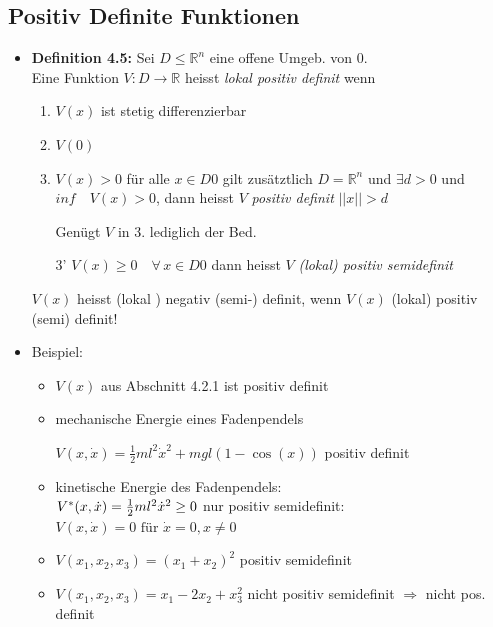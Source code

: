 \documentclass[ngerman]{tudscrreprt}
\begin{document}
\subsection{Positiv Definite Funktionen}
\begin{itemize}
\item \textbf{Definition 4.5:} Sei $D \le \mathbb{R}^n $ eine offene Umgeb. von 0.\\
Eine Funktion $V: D\rightarrow \mathbb{R}$ heisst \textit{lokal positiv definit} wenn
\begin{enumerate}
\item $V(x) $ ist stetig differenzierbar
\item $V(0)$ 
\item $V(x)> 0$ für alle $x \in D {0} $ gilt zusätztlich $D = \mathbb{R}^n $ und $\exists d> 0$ und $inf\quad V(x) > 0 $, dann heisst $V$ \textit{positiv definit} $ ||x|| > d$

Genügt $V$ in 3. lediglich der Bed.\\
\item [3'] $V(x) \ge 0 \quad \forall \, x\in D {0} $ dann heisst $V$ \textit{(lokal) positiv semidefinit}
\end{enumerate} 
$V(x)$ heisst (lokal ) negativ (semi-) definit, wenn \textit{ $V(x)$} (lokal) positiv (semi) definit!
\item Beispiel: 
\begin{itemize}
\item $V(x)$ aus Abschnitt 4.2.1 ist positiv definit
\item mechanische Energie eines Fadenpendels 
\begin{figure}[H] 
  \centering 
  \def\svgwidth{300pt} 
   
\end{figure} 
$V(x, \dot x) = \frac{1}{2} m l^2 \dot x^2 + m g l (1-\cos(x))$ positiv definit
\item kinetische Energie des Fadenpendels: \\$
V^* (x, \dot x) = \frac{1}{2} ml^2 \dot x^2 \ge 0\\
$
nur positiv semidefinit: $V(x, \dot x) = 0 \text{ für } \dot x = 0, x\ne 0$
\item $V(x_1,x_2,x_3) = (x_1 + x_2)^2$ positiv semidefinit
\item $V(x_1, x_2,x_3) = x_1 - 2x_2 + x_3^2$ nicht positiv semidefinit $\Rightarrow$ nicht pos. definit
\end{itemize}
\end{itemize}
\end{document}
